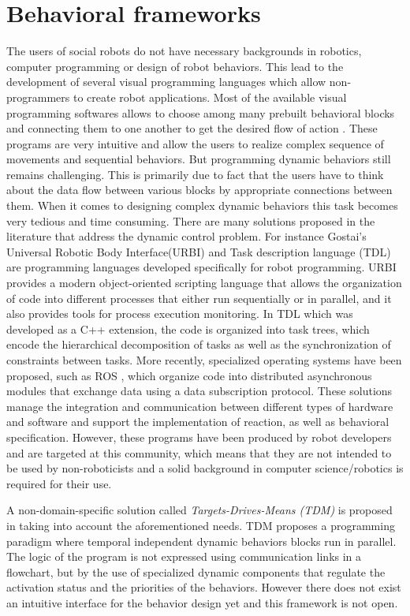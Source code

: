 \section{Behavioral frameworks} %
The users of social robots do not have necessary backgrounds in robotics, computer programming or design of robot behaviors. This lead to the development of several visual programming languages which allow non-programmers to create robot applications. Most of the available visual programming softwares allows to choose among many prebuilt behavioral blocks and connecting them to one another to get the desired flow of action \cite{MSRS4} \cite{Choregraphe}. These programs are very intuitive and allow the users to realize complex sequence of movements and sequential behaviors. But programming dynamic behaviors still remains challenging. This is primarily due to fact that the users have to think about the data flow between various blocks by appropriate connections between them. When it comes to designing complex dynamic behaviors this task becomes very tedious and time consuming. There are many solutions proposed in the literature that address the dynamic control problem. For instance Gostai's Universal Robotic Body Interface(URBI) \cite{baillie2008urbi} and Task description language (TDL) \cite{simmons1998task} are programming languages developed specifically for robot programming. URBI provides a modern object-oriented scripting language that allows the organization of code into different processes that either run sequentially or in parallel, and it also provides tools for process execution monitoring. In TDL which was developed as a C++ extension, the code is organized into task trees, which encode the hierarchical decomposition of tasks as well as the synchronization of constraints between tasks. More recently, specialized operating systems have been proposed, such as ROS \cite{quigley2009ros}, which organize code into distributed asynchronous modules that exchange data using a data subscription protocol. These solutions manage the integration and communication between different types of hardware and software and support the implementation of reaction, as well as behavioral specification. However, these programs have been produced by robot developers and are targeted at this community, which means that they are not intended to be used by non-roboticists and a solid background in computer science/robotics is required for their use.

A non-domain-specific solution called \emph{Targets-Drives-Means (TDM)} is proposed in \cite{berenz2014targets} taking into account the aforementioned needs. TDM proposes a programming paradigm where temporal independent dynamic behaviors blocks run in parallel. The logic of the program is not expressed using communication links in a flowchart, but by the use of specialized dynamic components that regulate the activation status and the priorities of the behaviors. However there does not exist an intuitive interface for the behavior design yet and this framework is not open.
